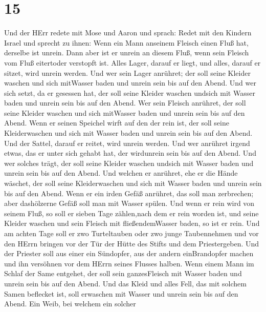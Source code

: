 \hypertarget{section-14}{%
\section{15}\label{section-14}}

 Und der HErr redete mit Mose und Aaron und sprach:
 Redet mit den Kindern Israel und sprecht zu ihnen: Wenn ein
Mann anseinem Fleisch einen Fluß hat, derselbe ist unrein. 
Dann aber ist er unrein an diesem Fluß, wenn sein Fleisch vom Fluß
eitertoder verstopft ist.  Alles Lager, darauf er liegt, und
alles, darauf er sitzet, wird unrein werden.  Und wer sein
Lager anrühret; der soll seine Kleider waschen und sich mitWasser baden
und unrein sein bis auf den Abend.  Und wer sich setzt, da
er gesessen hat, der soll seine Kleider waschen undsich mit Wasser baden
und unrein sein bis auf den Abend.  Wer sein Fleisch
anrühret, der soll seine Kleider waschen und sich mitWasser baden und
unrein sein bis auf den Abend.  Wenn er seinen Speichel
wirft auf den der rein ist, der soll seine Kleiderwaschen und sich mit
Wasser baden und unrein sein bis auf den Abend.  Und der
Sattel, darauf er reitet, wird unrein werden.  Und wer
anrühret irgend etwas, das er unter sich gehabt hat, der wirdunrein sein
bis auf den Abend. Und wer solches trägt, der soll seine Kleider waschen
undsich mit Wasser baden und unrein sein bis auf den Abend.
 Und welchen er anrühret, ehe er die Hände wäschet, der
soll seine Kleiderwaschen und sich mit Wasser baden und unrein sein bis
auf den Abend.  Wenn er ein irden Gefäß anrühret, das soll
man zerbrechen; aber dashölzerne Gefäß soll man mit Wasser spülen.
 Und wenn er rein wird von seinem Fluß, so soll er sieben
Tage zählen,nach dem er rein worden ist, und seine Kleider waschen und
sein Fleisch mit fließendemWasser baden, so ist er rein. 
Und am achten Tage soll er zwo Turteltauben oder zwo junge Taubennehmen
und vor den HErrn bringen vor der Tür der Hütte des Stifts und dem
Priestergeben.  Und der Priester soll aus einer ein
Sündopfer, aus der andern einBrandopfer machen und ihn versöhnen vor dem
HErrn seines Flusses halben.  Wenn einem Mann im Schlaf der
Same entgehet, der soll sein ganzesFleisch mit Wasser baden und unrein
sein bis auf den Abend.  Und das Kleid und alles Fell, das
mit solchem Samen beflecket ist, soll erwaschen mit Wasser und unrein
sein bis auf den Abend.  Ein Weib, bei welchem ein solcher

